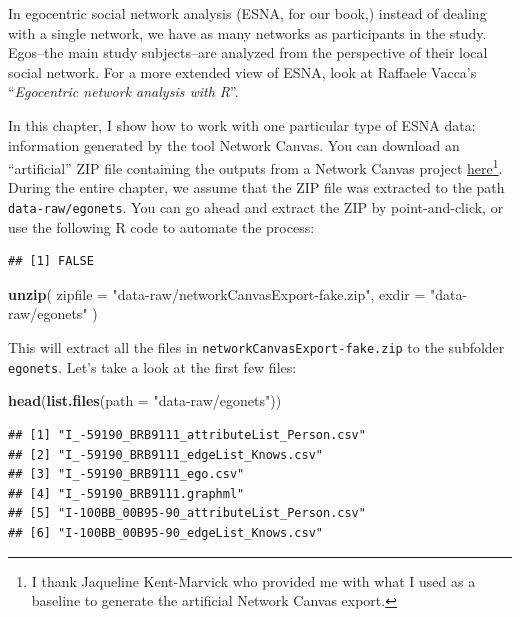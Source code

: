 \documentclass[
]{book}
\newenvironment{Shaded}{\begin{snugshade}}{\end{snugshade}}
\newcommand{\AttributeTok}[1]{\textcolor[rgb]{0.13,0.29,0.53}{#1}}
\newcommand{\FunctionTok}[1]{\textcolor[rgb]{0.13,0.29,0.53}{\textbf{#1}}}
\newcommand{\NormalTok}[1]{#1}
\newcommand{\StringTok}[1]{\textcolor[rgb]{0.31,0.60,0.02}{#1}}
\begin{document}
In egocentric social network analysis (ESNA, for our book,) instead of dealing with a single network, we have as many networks as participants in the study. Egos--the main study subjects--are analyzed from the perspective of their local social network. For a more extended view of ESNA, look at Raffaele Vacca's ``\emph{Egocentric network analysis with R}''.

In this chapter, I show how to work with one particular type of ESNA data: information generated by the tool Network Canvas. You can download an ``artificial'' ZIP file containing the outputs from a Network Canvas project \href{data-raw/networkCanvasExport-fake.zip}{here}\footnote{I thank Jaqueline Kent-Marvick who provided me with what I used as a baseline to generate the artificial Network Canvas export.}. During the entire chapter, we assume that the ZIP file was extracted to the path \texttt{data-raw/egonets}. You can go ahead and extract the ZIP by point-and-click, or use the following R code to automate the process:

\begin{verbatim}
## [1] FALSE
\end{verbatim}

\begin{Shaded}
\begin{Highlighting}[]
\FunctionTok{unzip}\NormalTok{(}
  \AttributeTok{zipfile =} \StringTok{"data{-}raw/networkCanvasExport{-}fake.zip"}\NormalTok{,}
  \AttributeTok{exdir   =} \StringTok{"data{-}raw/egonets"}
\NormalTok{  )}
\end{Highlighting}
\end{Shaded}

This will extract all the files in \texttt{networkCanvasExport-fake.zip} to the subfolder \texttt{egonets}. Let's take a look at the first few files:

\begin{Shaded}
\begin{Highlighting}[]
\FunctionTok{head}\NormalTok{(}\FunctionTok{list.files}\NormalTok{(}\AttributeTok{path =} \StringTok{"data{-}raw/egonets"}\NormalTok{))}
\end{Highlighting}
\end{Shaded}

\begin{verbatim}
## [1] "I_-59190_BRB9111_attributeList_Person.csv"
## [2] "I_-59190_BRB9111_edgeList_Knows.csv"      
## [3] "I_-59190_BRB9111_ego.csv"                 
## [4] "I_-59190_BRB9111.graphml"                 
## [5] "I-100BB_00B95-90_attributeList_Person.csv"
## [6] "I-100BB_00B95-90_edgeList_Knows.csv"
\end{verbatim}
\end{document}
